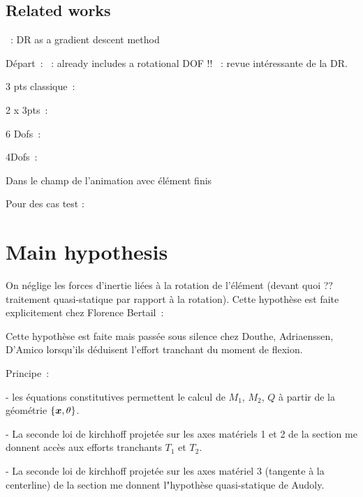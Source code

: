 \subsection{Related works}

~: DR as a gradient descent method

Départ~:
~: already includes a rotational DOF !!
~: revue intéressante de la DR.

3 pts classique~:

2 x 3pts~:

6 Dofs~:

4Dofs~:

Dans le champ de l'animation  avec élément finis

Pour des cas test :




\clearpage
\section{Main hypothesis}

On néglige les forces d'inertie liées à la rotation de l'élément  (devant quoi ?? traitement quasi-statique par rapport à la rotation). Cette hypothèse est faite explicitement chez Florence Bertail~:



Cette hypothèse est faite mais passée sous silence chez Douthe, Adriaenssen, D'Amico lorsqu'ils déduisent l'effort tranchant du moment de flexion.

Principe~:

- les équations constitutives permettent le calcul de $M_1$, $M_2$, $Q$ à partir de la géométrie $\{\boldsymbol{x},\theta\}$.

- La seconde loi de kirchhoff projetée sur les axes matériels 1 et 2 de la section me donnent accès aux efforts tranchants $T_1$ et $T_2$.

- La seconde loi de kirchhoff projetée sur les axes matériel 3 (tangente à la centerline) de la section me donnent l"hypothèse quasi-statique de Audoly.



